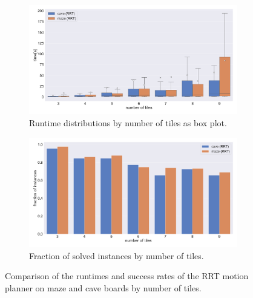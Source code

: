 \begin{figure}[htpb]
\begin{subfigure}[b]{\textwidth}
\centering
\includegraphics[width=\textwidth]{figures/plots/heuristic_solvers_i1/rrt_i1_maze_vs_cave_time.pdf}
\caption{Runtime distributions by number of tiles as box plot.}
\label{fig:i1_rrt_maze_cave_time}
\end{subfigure}
\begin{subfigure}[b]{\textwidth}
\centering
\includegraphics[width=\textwidth]{figures/plots/heuristic_solvers_i1/rrt_i1_maze_vs_cave_fraction_solved.pdf}
\caption{Fraction of solved instances by number of tiles.}
\label{fig:i1_rrt_maze_cave_fraction_solved}
\end{subfigure}
\caption[Runtime and success rate of RRT on maze and cave boards] {Comparison of the runtimes and success rates of the RRT motion planner on maze and cave boards by number of tiles.}
\label{fig:i1_rrt_maze_cave}
\end{figure}


